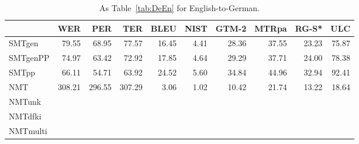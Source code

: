 \documentclass[a4paper,11pt]{article}
\begin{document}
\begin{table}[t]
\begin{tabular}{lrrrrrrrrr}
\toprule
         & WER   &  PER  & TER   &  BLEU & NIST & GTM-2 & MTRpa & RG-S* & ULC \\
\midrule
SMTgen	 & 79.55 & 68.95 & 77.57 & 16.45 & 4.41 & 28.36 & 37.55 & 23.23 & 75.87 \\  
SMTgenPP & 74.97 & 63.42 & 72.92 & 17.85 & 4.64 & 29.29 & 37.71 & 24.00 & 78.38 \\  
SMTpp	 & 66.11 & 54.71 & 63.92 & 24.52 & 5.60 & 34.84 & 44.96 & 32.94 & 92.41 \\  
NMT	 & 308.21 & 296.55 & 307.29 & 3.06 & 1.02 & 10.42 & 21.74 & 13.22 & 18.64 \\  
NMTunk  \\
NMTdfki \\
NMTmulti \\
\bottomrule
\end{tabular}
 \caption{As Table~\ref{tab:DeEn} for English-to-German.}
 \label{tab:EnDe}
\end{table}
\end{document}
